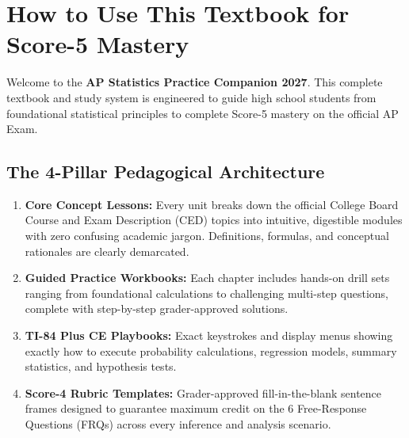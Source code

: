 \tableofcontents
\clearpage

\chapter*{How to Use This Textbook for Score-5 Mastery}

Welcome to the \textbf{AP Statistics Practice Companion 2027}. This complete textbook and study system is engineered to guide high school students from foundational statistical principles to complete Score-5 mastery on the official AP Exam.

\section*{The 4-Pillar Pedagogical Architecture}
\begin{enumerate}[leftmargin=1.5em]
  \item \textbf{Core Concept Lessons:} Every unit breaks down the official College Board Course and Exam Description (CED) topics into intuitive, digestible modules with zero confusing academic jargon. Definitions, formulas, and conceptual rationales are clearly demarcated.
  \item \textbf{Guided Practice Workbooks:} Each chapter includes hands-on drill sets ranging from foundational calculations to challenging multi-step questions, complete with step-by-step grader-approved solutions.
  \item \textbf{TI-84 Plus CE Playbooks:} Exact keystrokes and display menus showing exactly how to execute probability calculations, regression models, summary statistics, and hypothesis tests.
  \item \textbf{Score-4 Rubric Templates:} Grader-approved fill-in-the-blank sentence frames designed to guarantee maximum credit on the 6 Free-Response Questions (FRQs) across every inference and analysis scenario.
\end{enumerate}


